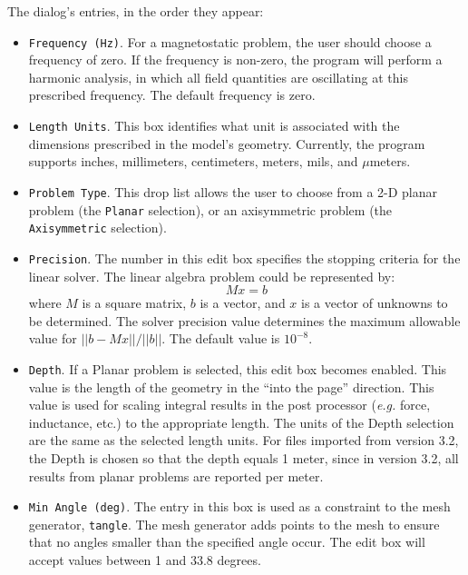 \documentclass[12pt]{report}
\begin{document}
The dialog's entries, in the order they appear:

\begin{itemize}

\item{\tt Frequency (Hz)}.  For a magnetostatic problem, the user should
choose a frequency of zero.  If the frequency is non-zero, the program
will perform a harmonic analysis, in which all field quantities are
oscillating at this prescribed frequency.  The default frequency is zero.

\item{\tt Length Units}.  This box identifies what unit is associated with
the dimensions prescribed in the model's geometry.  Currently, the program
supports inches, millimeters, centimeters, meters, mils, and $\mu$meters.

\item{\tt Problem Type}.  This drop list allows the user to choose from a
2-D planar problem (the {\tt Planar} selection), or an axisymmetric problem
(the {\tt Axisymmetric} selection).

\item{\tt Precision}.  The number in this edit box specifies the stopping
criteria for the linear solver.  The linear algebra problem could be
represented by:
\begin{displaymath}
M x=b
\end{displaymath}
where $M$ is a square matrix, $b$ is a vector, and $x$ is a vector of
unknowns to be determined.  The solver precision value determines the
maximum allowable value for $||b-M x||/||b||$.  The default value is
$10^{-8}$.

\item{\tt Depth}.  If a Planar problem is selected, this edit box becomes
enabled.  This value is the length of the geometry in the ``into the page''
direction.  This value is used for scaling integral results in the post
processor ({\em e.g.} force, inductance, etc.) to the appropriate length.
The units of the Depth selection are the same as the selected length units.
For files imported from version 3.2, the Depth is chosen so that the depth
equals 1 meter, since in version 3.2, all results from planar problems are
reported per meter.

\item{\tt Min Angle (deg)}.  The entry in this box is used as a constraint
to the mesh generator, {\tt tangle}.  The mesh generator adds points to the
mesh to ensure that no angles smaller than the specified angle occur.  The
edit box will accept values between 1 and 33.8 degrees.


\end{itemize}
\end{document}

